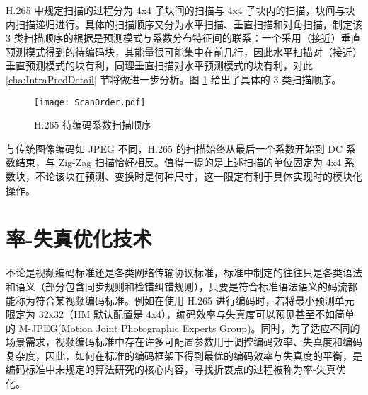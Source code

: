 H.265 中规定扫描的过程分为 4x4 子块间的扫描与 4x4 子块内的扫描，块间与块内扫描递归进行。具体的扫描顺序又分为水平扫描、垂直扫描和对角扫描，制定该 3 类扫描顺序的根据是预测模式与系数分布特征间的联系：一个采用（接近）垂直预测模式得到的待编码块，其能量很可能集中在前几行，因此水平扫描对（接近）垂直预测模式的块有利，同理垂直扫描对水平预测模式的块有利，对此 \ref{cha:IntraPredDetail} 节将做进一步分析。图 \ref{fig:ScanOrder} 给出了具体的 3 类扫描顺序。
\begin{figure}[hbt]
    \centering
    \texttt{[image: ScanOrder.pdf]}
    \caption{H.265 待编码系数扫描顺序}
    \label{fig:ScanOrder}
\end{figure}

与传统图像编码如 JPEG 不同，H.265 的扫描始终从最后一个系数开始到 DC 系数结束，与 Zig-Zag 扫描恰好相反。值得一提的是上述扫描的单位固定为 4x4 系数块，不论该块在预测、变换时是何种尺寸，这一限定有利于具体实现时的模块化操作。

\section{率-失真优化技术}
不论是视频编码标准还是各类网络传输协议标准，标准中制定的往往只是各类语法和语义（部分包含同步规则和检错纠错规则），只要是符合标准语法语义的码流都能称为符合某视频编码标准。例如在使用 H.265 进行编码时，若将最小预测单元限定为 32x32（HM 默认配置是 4x4），编码效率与失真度可以预见甚至不如简单的 M-JPEG(Motion Joint Photographic Experts Group)。同时，为了适应不同的场景需求，视频编码标准中存在许多可配置参数用于调控编码效率、失真度和编码复杂度，因此，如何在标准的编码框架下得到最优的编码效率与失真度的平衡，是编码标准中未规定的算法研究的核心内容，寻找折衷点的过程被称为率-失真优化。

